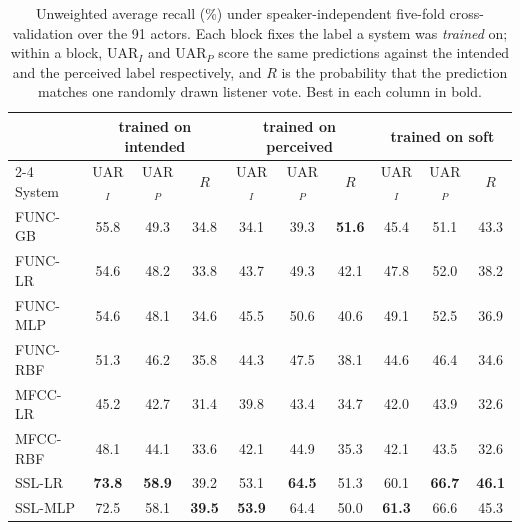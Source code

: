 \begin{table}[t]
\centering
\caption{Unweighted average recall (\%) under speaker-independent five-fold cross-validation over the 91 actors. Each block fixes the label a system was \emph{trained} on; within a block, UAR$_I$ and UAR$_P$ score the same predictions against the intended and the perceived label respectively, and $R$ is the probability that the prediction matches one randomly drawn listener vote. Best in each column in bold.}
\label{tab:main}
\small
\begin{tabular}{l@{\hspace{5mm}}ccc@{\hspace{5mm}}ccc@{\hspace{5mm}}ccc}
\hline
 & \multicolumn{3}{c}{trained on intended} & \multicolumn{3}{c}{trained on perceived} & \multicolumn{3}{c}{trained on soft} \\
\cline{2-4}\cline{5-7}\cline{8-10}
System & UAR$_I$ & UAR$_P$ & $R$ & UAR$_I$ & UAR$_P$ & $R$ & UAR$_I$ & UAR$_P$ & $R$ \\
\hline
FUNC-GB & 55.8 & 49.3 & 34.8 & 34.1 & 39.3 & \textbf{51.6} & 45.4 & 51.1 & 43.3 \\
FUNC-LR & 54.6 & 48.2 & 33.8 & 43.7 & 49.3 & 42.1 & 47.8 & 52.0 & 38.2 \\
FUNC-MLP & 54.6 & 48.1 & 34.6 & 45.5 & 50.6 & 40.6 & 49.1 & 52.5 & 36.9 \\
FUNC-RBF & 51.3 & 46.2 & 35.8 & 44.3 & 47.5 & 38.1 & 44.6 & 46.4 & 34.6 \\
MFCC-LR & 45.2 & 42.7 & 31.4 & 39.8 & 43.4 & 34.7 & 42.0 & 43.9 & 32.6 \\
MFCC-RBF & 48.1 & 44.1 & 33.6 & 42.1 & 44.9 & 35.3 & 42.1 & 43.5 & 32.6 \\
SSL-LR & \textbf{73.8} & \textbf{58.9} & 39.2 & 53.1 & \textbf{64.5} & 51.3 & 60.1 & \textbf{66.7} & \textbf{46.1} \\
SSL-MLP & 72.5 & 58.1 & \textbf{39.5} & \textbf{53.9} & 64.4 & 50.0 & \textbf{61.3} & 66.6 & 45.3 \\
\hline
\end{tabular}
\vspace{-4mm}
\end{table}
